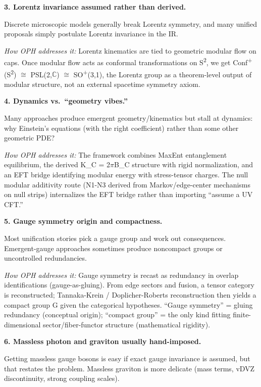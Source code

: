 \documentclass[11pt,a4paper]{article}
\theoremstyle{remark}
\begin{document}
\textbf{3. Lorentz invariance assumed rather than derived.}

Discrete microscopic models generally break Lorentz symmetry, and many unified proposals simply postulate Lorentz invariance in the IR.

\emph{How OPH addresses it:} Lorentz kinematics are tied to geometric modular flow on caps. Once modular flow acts as conformal transformations on S\textsuperscript{2}, we get Conf\textsuperscript{+}(S\textsuperscript{2}) \ensuremath{\cong} PSL(2,\ensuremath{\mathbb{C}}) \ensuremath{\cong} SO\textsuperscript{+}(3,1), the Lorentz group as a theorem-level output of modular structure, not an external spacetime symmetry axiom.

\textbf{4. Dynamics vs.~``geometry vibes.''}

Many approaches produce emergent geometry/kinematics but stall at dynamics: why Einstein's equations (with the right coefficient) rather than some other geometric PDE?

\emph{How OPH addresses it:} The framework combines MaxEnt entanglement equilibrium, the derived K\_C = 2\ensuremath{\pi}B\_C structure with rigid normalization, and an EFT bridge identifying modular energy with stress-tensor charges. The null modular additivity route (N1-N3 derived from Markov/edge-center mechanisms on null strips) internalizes the EFT bridge rather than importing ``assume a UV CFT.''

\textbf{5. Gauge symmetry origin and compactness.}

Most unification stories pick a gauge group and work out consequences. Emergent-gauge approaches sometimes produce noncompact groups or uncontrolled redundancies.

\emph{How OPH addresses it:} Gauge symmetry is recast as redundancy in overlap identifications (gauge-as-gluing). From edge sectors and fusion, a tensor category is reconstructed; Tannaka-Krein / Doplicher-Roberts reconstruction then yields a compact group G given the categorical hypotheses. ``Gauge symmetry'' = gluing redundancy (conceptual origin); ``compact group'' = the only kind fitting finite-dimensional sector/fiber-functor structure (mathematical rigidity).

\textbf{6. Massless photon and graviton usually hand-imposed.}

Getting massless gauge bosons is easy if exact gauge invariance is assumed, but that restates the problem. Massless graviton is more delicate (mass terms, vDVZ discontinuity, strong coupling scales).
\end{document}
